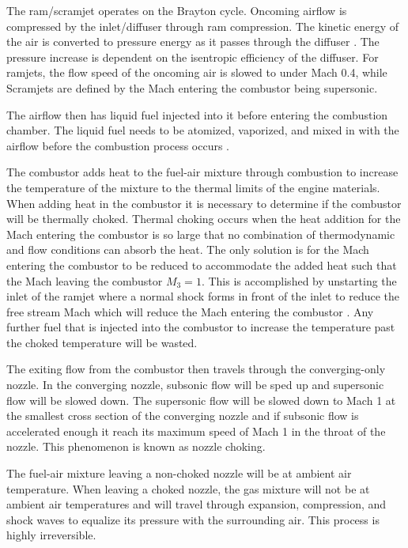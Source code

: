 \documentclass[conf]{new-aiaa} %
\begin{document}
The ram/scramjet operates on the Brayton cycle. Oncoming airflow is compressed by the inlet/diffuser through ram compression. The kinetic energy of the air is converted to pressure energy as it passes through the diffuser \cite{rycey1996jetengine}. The pressure increase is dependent on the isentropic efficiency of the diffuser. For ramjets, the flow speed of the oncoming air is slowed to under Mach 0.4, while Scramjets are defined by the Mach entering the combustor being supersonic.

The airflow then has liquid fuel injected into it before entering the combustion chamber. The liquid fuel needs to be atomized, vaporized, and mixed in with the airflow before the combustion process occurs \cite{oates1997aerothermodynamics}.

The combustor adds heat to the fuel-air mixture through combustion to increase the temperature of the mixture to the thermal limits of the engine materials. When adding heat in the combustor it is necessary to determine if the combustor will be thermally choked. Thermal choking occurs when the heat addition for the Mach entering the combustor is so large that no combination of thermodynamic and flow conditions can absorb the heat. The only solution is for the Mach entering the combustor to be reduced to accommodate the added heat such that the Mach leaving the combustor $M_3=1$. This is accomplished by unstarting the inlet of the ramjet where a normal shock forms in front of the inlet to reduce the free stream Mach which will reduce the Mach entering the combustor \cite{dahm2023project}. Any further fuel that is injected into the combustor to increase the temperature past the choked temperature will be wasted.

The exiting flow from the combustor then travels through the converging-only nozzle. In the converging nozzle, subsonic flow will be sped up and supersonic flow will be slowed down. The supersonic flow will be slowed down to Mach 1 at the smallest cross section of the converging nozzle and if subsonic flow is accelerated enough it reach its maximum speed of Mach 1 in the throat of the nozzle. This phenomenon is known as nozzle choking.

The fuel-air mixture leaving a non-choked nozzle will be at ambient air temperature. When leaving a choked nozzle, the gas mixture will not be at ambient air temperatures and will travel through expansion, compression, and shock waves to equalize its pressure with the surrounding air. This process is highly irreversible.
\end{document}

